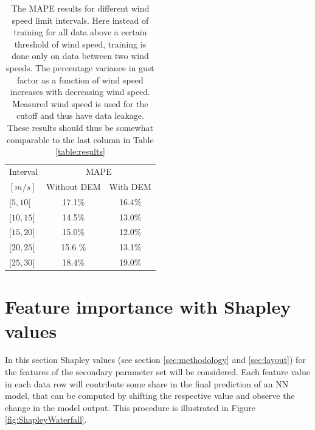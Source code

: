 \begin{table}[h]
    \caption[Model result looking at closed wind speed intervals]{The MAPE results for different wind speed limit intervals. Here instead of training for all data above a certain threshold of wind speed, training is done only on data between two wind speeds. The percentage variance in gust factor as a function of wind speed increases with decreasing wind speed. Measured wind speed is used for the cutoff and thus have data leakage. These results should thus be somewhat comparable to the last column in Table \ref{table:results}}
    \label{table:closed_intervals}
    \centering
    \begin{tabular}{lcc}
        \toprule
        Interval &  \multicolumn{2}{c}{MAPE}\\
        $[m/s]$ & Without DEM & With DEM \\
        \midrule
        $[5, 10[$ & 17.1\% & 16.4\%\\
        $[10, 15[$ & 14.5\% & 13.0\%\\
        $[15, 20[$ & 15.0\% & 12.0\%\\
        $[20, 25[$ & 15.6 \% & 13.1\%\\
        $[25, 30[$ & 18.4\% & 19.0\%\\
        \bottomrule
    \end{tabular}
\end{table}

\section{Feature importance with Shapley values}
In this section Shapley values (see section \ref{sec:methodology} and \ref{sec:layout}) for the features of the secondary parameter set will be considered. Each feature value in each data row will contribute some share in the final prediction of an NN model, that can be computed by shifting the respective value and observe the change in the model output. This procedure is illustrated in Figure \ref{fig:ShapleyWaterfall}.

